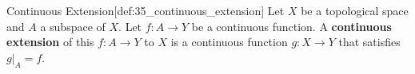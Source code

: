 \begin{defBox}{Continuous Extension}[def:35_continuous_extension]
    Let \( X \) be a topological space and \( A \) a subspace of \( X \). 
    Let \( f: A \rightarrow Y \) be a continuous function. 
    A \textbf{continuous extension} of this \( f: A \rightarrow Y \) to \( X \) is a 
    continuous function \( g: X \rightarrow Y \) that satisfies \( g \vert_{ A } = f \).
\end{defBox}